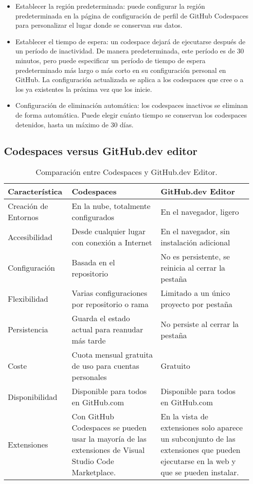 \begin{itemize}
    \item Establecer la región predeterminada: puede configurar la región predeterminada en la página de configuración de perfil de GitHub Codespaces para personalizar el lugar donde se conservan sus datos.
    \item Establecer el tiempo de espera: un codespace dejará de ejecutarse después de un período de inactividad. De manera predeterminada, este período es de 30 minutos, pero puede especificar un período de tiempo de espera predeterminado más largo o más corto en su configuración personal en GitHub. La configuración actualizada se aplica a los codespaces que cree o a los ya existentes la próxima vez que los inicie.
    \item Configuración de eliminación automática: los codespaces inactivos se eliminan de forma automática. Puede elegir cuánto tiempo se conservan los codespaces detenidos, hasta un máximo de 30 días.
\end{itemize}

\subsection{Codespaces versus GitHub.dev editor}

\begin{table}[h]
    \centering
    \begin{tabular}{p{4cm}p{5cm}p{5cm}}
      \toprule
      Característica & Codespaces & GitHub.dev Editor \\
      \midrule
      Creación de Entornos & En la nube, totalmente configurados & En el navegador, ligero \\
      Accesibilidad & Desde cualquier lugar con conexión a Internet & En el navegador, sin instalación adicional \\
      Configuración & Basada en el repositorio & No es persistente, se reinicia al cerrar la pestaña \\
      Flexibilidad & Varias configuraciones por repositorio o rama & Limitado a un único proyecto por pestaña \\
      Persistencia & Guarda el estado actual para reanudar más tarde & No persiste al cerrar la pestaña \\
      Coste & Cuota mensual gratuita de uso para cuentas personales & Gratuito \\
      Disponibilidad & Disponible para todos en GitHub.com & Disponible para todos en GitHub.com \\ 
      Extensiones & Con GitHub Codespaces se pueden usar la mayoría de las extensiones de Visual Studio Code Marketplace. & En la vista de extensiones solo aparece un subconjunto de las extensiones que pueden ejecutarse en la web y que se pueden instalar. \\             
      \bottomrule
    \end{tabular}
    \caption{Comparación entre Codespaces y GitHub.dev Editor.}
    \label{tab:comparacion}
\end{table}
  
